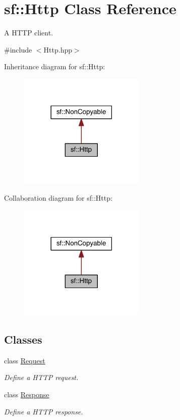 \hypertarget{classsf_1_1_http}{\section{sf\-:\-:Http Class Reference}
\label{classsf_1_1_http}
}


A H\-T\-T\-P client.  




{\ttfamily \#include $<$Http.\-hpp$>$}



Inheritance diagram for sf\-:\-:Http\-:
\nopagebreak
\begin{figure}[H]
\begin{center}
\leavevmode
\includegraphics[width=170pt]{classsf_1_1_http__inherit__graph}
\end{center}
\end{figure}


Collaboration diagram for sf\-:\-:Http\-:
\nopagebreak
\begin{figure}[H]
\begin{center}
\leavevmode
\includegraphics[width=170pt]{classsf_1_1_http__coll__graph}
\end{center}
\end{figure}
\subsection*{Classes}
\begin{DoxyCompactItemize}
\item 
class \hyperlink{classsf_1_1_http_1_1_request}{Request}
\begin{DoxyCompactList}\small\item\em Define a H\-T\-T\-P request. \end{DoxyCompactList}\item 
class \hyperlink{classsf_1_1_http_1_1_response}{Response}
\begin{DoxyCompactList}\small\item\em Define a H\-T\-T\-P response. \end{DoxyCompactList}\end{DoxyCompactItemize}
